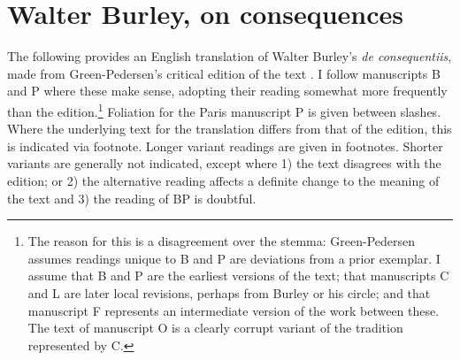 \chapter{Walter Burley, on consequences}

The following provides an English translation of Walter Burley's \textit{de consequentiis}, made from Green-Pedersen's critical edition of the text \cite{Green-Pedersen1980b}. I follow manuscripts B and P where these make sense, adopting their reading somewhat more frequently than the edition.\footnote{The reason for this is a disagreement over the stemma: Green-Pedersen assumes readings unique to B and P are deviations from a prior exemplar. I assume that B and P are the earliest versions of the text; that manuscripts C and L are later local revisions, perhaps from Burley or his circle; and that manuscript F represents an intermediate version of the work between these. The text of manuscript O is a clearly corrupt variant of the tradition represented by C.} Foliation for the Paris manuscript P is given between slashes. Where the underlying text for the translation differs from that of the edition, this is indicated via footnote. Longer variant readings are given in footnotes. Shorter variants are generally not indicated, except where 1) the text disagrees with the edition; or 2) the alternative reading affects a definite change to the meaning of the text and 3) the reading of BP is doubtful. 

